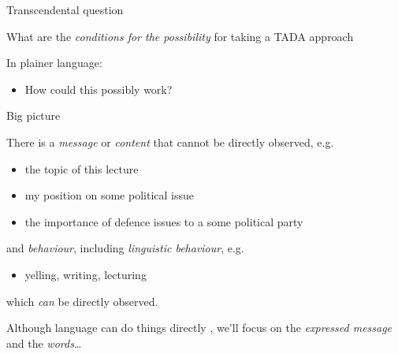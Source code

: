 \documentclass{hertieteaching}\usepackage[]{graphicx}\usepackage[]{color}
\begin{document}
\begin{frame}{Transcendental question}


What are the \textit{conditions for the possibility}
for taking a TADA approach

In plainer language:
\begin{itemize}
  \item How could this possibly work?
\end{itemize}


\end{frame}
\begin{frame}{Big picture}

There is a \textit{message} or \textit{content} that cannot be directly observed,
e.g.
\begin{itemize}
  \item the topic of this lecture
  \item my position on some political issue
  \item the importance of defence issues to a some political party
\end{itemize}
and \textit{behaviour}, including \textit{linguistic behaviour}, e.g.
\begin{itemize}
  \item yelling, writing, lecturing
\end{itemize}
which \textit{can} be directly observed.

Although language can do things directly \parencite{Austin1962}, we'll focus on the \textit{expressed message} and the \textit{words}\ldots

\end{frame}
\end{document}
